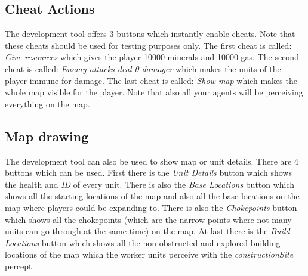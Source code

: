 \subsection{Cheat Actions}
The development tool offers 3 buttons which instantly enable cheats. Note that these cheats should be used for testing purposes only. The first cheat is called: \textit{Give resources} which gives the player 10000 minerals and 10000 gas. The second cheat is called: \textit{Enemy attacks deal 0 damager} which makes the units of the player immune for damage. The last cheat is called: \textit{Show map} which makes the whole map visible for the player. Note that also all your agents will be perceiving everything on the map. 

\subsection{Map drawing}
The development tool can also be used to show map or unit details. There are 4 buttons which can be used. First there is the \textit{Unit Details} button which shows the health and \textit{ID} of every unit. There is also the \textit{Base Locations} button which shows all the starting locations of the map and also all the base locations on the map where players could be expanding to. There is also the \textit{Chokepoints} button which shows all the chokepoints (which are the narrow points where not many units can go through at the same time) on the map. At last there is the \textit{Build Locations} button which shows all the non-obstructed and explored building locations of the map which the worker units perceive with the \textit{constructionSite} percept. 

